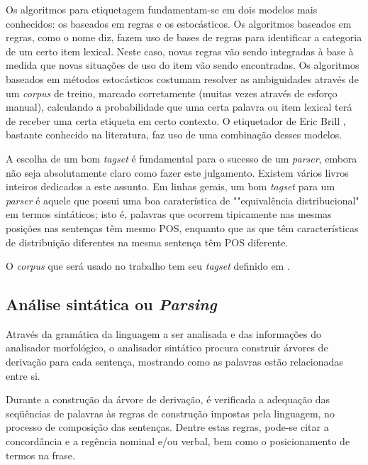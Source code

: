 Os algoritmos para etiquetagem fundamentam-se em dois modelos mais conhecidos: os baseados em regras e os estocásticos. Os algoritmos baseados em regras, como o nome diz, fazem uso de bases de regras para identificar a categoria de um certo item lexical. Neste caso, novas regras vão sendo integradas à base à medida que novas situações de uso do item vão sendo encontradas. Os algoritmos baseados em métodos estocásticos costumam resolver as ambiguidades através de um \emph{corpus} de treino, marcado corretamente (muitas vezes através de esforço manual), calculando a probabilidade que uma certa palavra ou item lexical terá de receber uma certa etiqueta em certo contexto. O etiquetador de Eric Brill \cite{brill95}, bastante conhecido na literatura, faz uso de uma combinação desses modelos.

A escolha de um bom \emph{tagset} é fundamental para o sucesso de um \emph{parser}, embora não seja absolutamente claro como fazer este julgamento. Existem vários livros inteiros dedicados a este assunto. Em linhas gerais, um bom \emph{tagset} para um \emph{parser} é aquele que possui uma boa caraterística de ""equivalência distribucional" em termos sintáticos; isto é, palavras que ocorrem tipicamente nas mesmas posições nas sentenças têm mesmo POS, enquanto que as que têm características de distribuição diferentes na mesma sentença têm POS diferente.

O \emph{corpus} que será usado no trabalho tem seu \emph{tagset} definido em \cite{branco08}.


\subsection{Análise sintática ou \emph{Parsing}} %
\label{sub:analise_sintatica_ou_parsing}

Através da gramática da linguagem a ser analisada e das informações do analisador morfológico, o analisador sintático procura construir árvores de derivação para cada sentença, mostrando como as palavras estão relacionadas entre si.

Durante a construção da árvore de derivação, é verificada a adequação das seqüências de palavras às regras de construção impostas pela linguagem, no processo de composição das sentenças. Dentre estas regras, pode-se citar a concordância e a regência nominal e/ou verbal, bem como o posicionamento de termos na frase.

